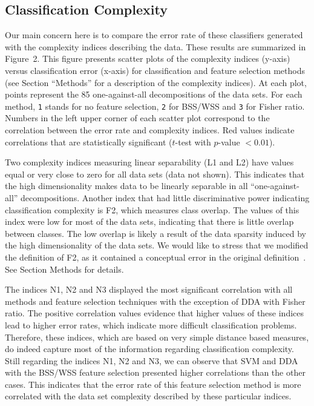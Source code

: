\documentclass[10pt]{bmc_article}
\newenvironment{bmcformat}{\begin{raggedright}\baselineskip20pt\sloppy\setboolean{publ}{false}}{\end{raggedright}\baselineskip20pt\sloppy}
\begin{document}
\begin{bmcformat}

\subsection*{Classification Complexity}


Our main concern here is to compare the error rate of these
classifiers generated with the complexity indices describing the
data. These results are summarized in Figure~2. This figure presents
scatter plots of the complexity indices (y-axis) versus classification
error (x-axis) for classification and feature selection methods (see
Section ``Methods'' for a description of the complexity indices). At
each plot, points represent the 85 one-against-all decompositions of
the data sets. For each method, {\tt 1} stands for no feature
selection, {\tt 2} for BSS/WSS and {\tt 3} for Fisher ratio. Numbers
in the left upper corner of each scatter plot correspond to the
correlation between the error rate and complexity indices. Red values
indicate correlations that are statistically significant ($t$-test
with $p$-value $< 0.01$).

Two complexity indices measuring linear separability (L1 and L2) have
values equal or very close to zero for all data sets (data not
shown). This indicates that the high dimensionality makes data to be
linearly separable in all ``one-against-all'' decompositions. Another
index that had little discriminative power indicating classification
complexity is F2, which measures class overlap. The values of this
index were low for most of the data sets, indicating that there is
little overlap between classes. The low overlap is likely a result
of the data sparsity induced by the high dimensionality of the data
sets. We would like to stress that we modified the definition of F2,
as it contained a conceptual error in the original
definition~\cite{Ho2002}. See Section Methods for details.


The indices N1, N2 and N3 displayed the most significant correlation
with all methods and feature selection techniques with the exception
of DDA with Fisher ratio. The positive correlation values evidence
that higher values of these indices lead to higher error rates, which
indicate more difficult classification problems. Therefore, these
indices, which are based on very simple distance based measures, do
indeed capture most of the information regarding classification
complexity. Still regarding the indices N1, N2 and N3, we can observe
that SVM and DDA with the BSS/WSS feature selection presented higher
correlations than the other cases. This indicates that the error rate
of this feature selection method is more correlated with the data set
complexity described by these particular indices.


\end{bmcformat}
\end{document}

